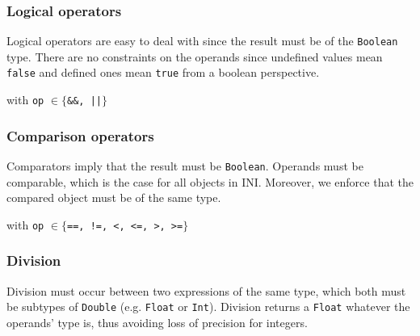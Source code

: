 \documentclass[11pt]{article}
\begin{document}
\begin{center}
 
\RightLabel{$[U \succeq V]$}
\DP
\end{center}

\subsubsection{Logical operators}

Logical operators are easy to deal with since the result must be of the \texttt{Boolean} type. There are no constraints on the operands since undefined values mean \texttt{false} and defined ones mean \texttt{true} from a boolean perspective.

\begin{center}
 
\DP
\end{center}
\begin{center}with  \texttt{op} $\in \{$\texttt{\&\&, ||}$\}$\end{center}

\subsubsection{Comparison operators}

Comparators imply that the result must be \texttt{Boolean}. Operands must be comparable, which is the case for all objects in INI. Moreover, we enforce that the compared object must be of the same type.

\begin{center}
 
\DP
\end{center}
\begin{center}with  \texttt{op} $\in \{$\texttt{==, !=, <, <=, >, >=}$\}$\end{center}

\subsubsection{Division}

Division must occur between two expressions of the same type, which both must be subtypes of \texttt{Double} (e.g. \texttt{Float} or \texttt{Int}). Division returns a \texttt{Float} whatever the operands' type is, thus avoiding loss of precision for integers.
\end{document}
